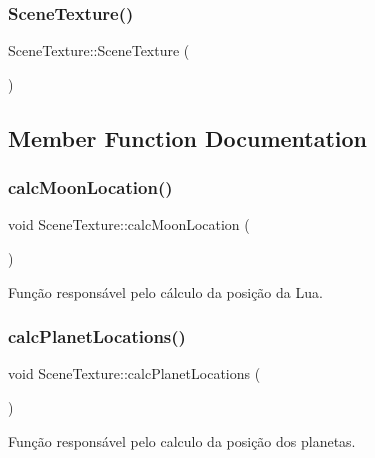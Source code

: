 \subsubsection{\texorpdfstring{SceneTexture()}{SceneTexture()}}
{\footnotesize\ttfamily Scene\+Texture\+::\+Scene\+Texture (\begin{DoxyParamCaption}{ }\end{DoxyParamCaption})}



\subsection{Member Function Documentation}
\mbox{\label{class_scene_texture_a0f8c125b6518c0903c2e47ac7d5b926a}} 
\subsubsection{\texorpdfstring{calcMoonLocation()}{calcMoonLocation()}}
{\footnotesize\ttfamily void Scene\+Texture\+::calc\+Moon\+Location (\begin{DoxyParamCaption}{ }\end{DoxyParamCaption})\hspace{0.3cm}{\ttfamily [private]}}



Função responsável pelo cálculo da posição da Lua. 

\mbox{\label{class_scene_texture_adcb3a2fbf04c722a62e52f82f3ff81c8}} 
\subsubsection{\texorpdfstring{calcPlanetLocations()}{calcPlanetLocations()}}
{\footnotesize\ttfamily void Scene\+Texture\+::calc\+Planet\+Locations (\begin{DoxyParamCaption}{ }\end{DoxyParamCaption})\hspace{0.3cm}{\ttfamily [private]}}



Função responsável pelo calculo da posição dos planetas. 

